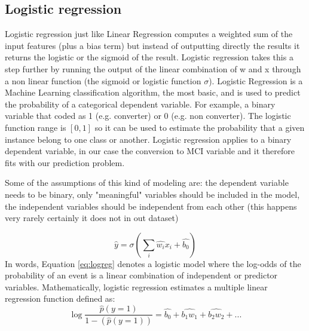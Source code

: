\documentclass[11pt]{article}
\theoremstyle{definition}
\theoremstyle{remark}
\begin{document}
{\subsection{Logistic regression}
\label{sse:logreg}

Logistic regression just like Linear Regression computes a weighted sum of the input features (plus a bias term) but instead of outputting directly the results it returns the logistic or the sigmoid of the result. Logistic regression takes this a step further by running the output  of the linear combination of w and x through a non linear function (the sigmoid or logistic function $\sigma$). Logistic Regression is a Machine Learning classification algorithm, the most basic, and is used to predict the probability of a categorical dependent variable. For example, a binary variable that coded as 1 (e.g. converter) or 0 (e.g. non converter). The logistic function range is $[0,1]$ so it can be used to estimate the probability that a given instance belong to one class or another. Logistic regression applies to a binary dependent variable, in our case the conversion to MCI variable and it therefore fits with our prediction problem.

Some of the assumptions of this kind of modeling are: the dependent variable needs to be binary, only "meaningful" variables should be included in the model, the independent variables should be independent from each other (this happens very rarely certainly it does not in out dataset) 

\begin{equation}
\hat{y} = \sigma(\sum_i \hat{w_i}x_i +\hat{b_0})
\label{eq:logreg}
\end{equation}
In words, Equation \ref{eq:logreg} denotes a logistic model where the log-odds of the probability of an event is a linear combination of independent or predictor variables. Mathematically, logistic regression estimates a multiple linear regression function defined as:
\begin{equation}
\log \frac{\hat{p}(y=1)}{1-(\hat{p}(y=1))} = \hat{b_0} + \hat{b_1w_1} + \hat{b_2w_2} + ...
\label{eq:logreg2}
\end{equation}

}
\end{document}
